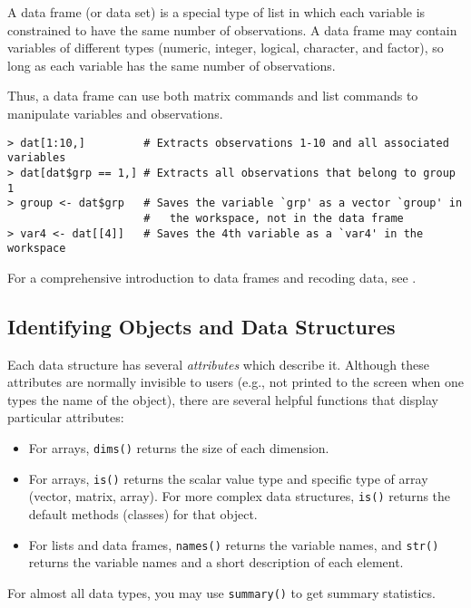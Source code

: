 A data frame (or data set) is a special type of list in which each
variable is constrained to have the same number of observations.  A
data frame may contain variables of different types (numeric,
integer, logical, character, and factor), so long as each variable has
the same number of observations. 

Thus, a data frame can use both matrix commands and list commands to
manipulate variables and observations.  
\begin{verbatim}
> dat[1:10,]         # Extracts observations 1-10 and all associated variables  
> dat[dat$grp == 1,] # Extracts all observations that belong to group 1 
> group <- dat$grp   # Saves the variable `grp' as a vector `group' in
                     #   the workspace, not in the data frame
> var4 <- dat[[4]]   # Saves the 4th variable as a `var4' in the workspace
\end{verbatim} 

For a comprehensive introduction to data frames and recoding data, see
.

\subsection{Identifying Objects and Data Structures}

Each data structure has several \emph{attributes} which describe it.
Although these attributes are normally invisible to users (e.g., not
printed to the screen when one types the name of the object), there are
several helpful functions that display particular attributes:  
\begin{itemize}
\item For arrays, {\tt dims()} returns the size of each dimension.  
\item For arrays, {\tt is()} returns the scalar value type and
specific type of array (vector, matrix, array).  For more complex data
structures, {\tt is()} returns the default methods (classes) for that object. 
\item For lists and data frames, {\tt names()} returns the variable
names, and {\tt str()} returns the variable names and a short
description of each element.  
\end{itemize}  
For almost all data types, you may use {\tt summary()} to get summary
statistics.  




